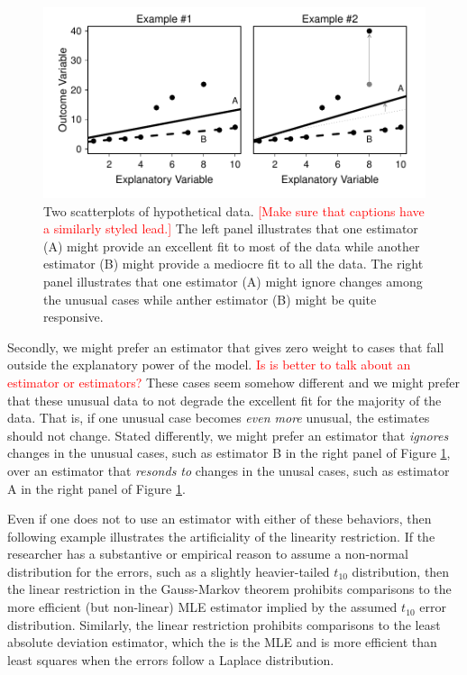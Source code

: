 \documentclass[12pt]{article}
\newcommand{\ctk}[1]{\textcolor{red}{#1}}
\begin{document}
\begin{figure}[h!]
\begin{center}
\includegraphics[scale = .7]{figs/best-fit-illustration.pdf}
\caption{Two scatterplots of hypothetical data. \ctk{[Make sure that captions have a similarly styled lead.]} 
The left panel illustrates that one estimator (A) might provide an excellent fit to most of the data while another estimator (B) might provide a mediocre fit to all the data. 
The right panel illustrates that one estimator (A) might ignore changes among the unusual cases while anther estimator (B) might be quite responsive.}\label{fig:best-fit-illustration}
\end{center}
\end{figure}

Secondly, we might prefer an estimator that gives zero weight to cases that fall outside the explanatory power of the model. \ctk{Is is better to talk about an estimator or estimators?}
These cases seem somehow different and we might prefer that these unusual data to not degrade the excellent fit for the majority of the data. 
That is, if one unusual case becomes \textit{even more} unusual, the estimates should not change. 
Stated differently, we might prefer an estimator that \textit{ignores} changes in the unusual cases, such as estimator B in the right panel of Figure \ref{fig:best-fit-illustration}, over an estimator that \textit{resonds to} changes in the unusal cases, such as estimator A in the right panel of Figure \ref{fig:best-fit-illustration}.

Even if one does not to use an estimator with either of these behaviors, then following example illustrates the artificiality of the linearity restriction. 
If the researcher has a substantive or empirical reason to assume a non-normal distribution for the errors, such as a slightly heavier-tailed $t_{10}$ distribution, then the linear restriction in the Gauss-Markov theorem prohibits comparisons to the more efficient (but non-linear) MLE estimator implied by the assumed $t_{10}$ error distribution. 
Similarly, the linear restriction prohibits comparisons to the least absolute deviation estimator, which the is the MLE and is more efficient than least squares when the errors follow a Laplace distribution. 
\end{document}
